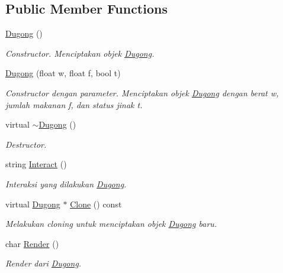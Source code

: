 \subsection*{Public Member Functions}
\begin{DoxyCompactItemize}
\item 
\hyperlink{classDugong_ab18a993807c0daa4b4a7eeaf7118ead7}{Dugong} ()
\begin{DoxyCompactList}\small\item\em Constructor. Menciptakan objek \hyperlink{classDugong}{Dugong}. \end{DoxyCompactList}\item 
\hyperlink{classDugong_af4aa8ab8370bbea5ccb75f5dd104f8e8}{Dugong} (float w, float f, bool t)
\begin{DoxyCompactList}\small\item\em Constructor dengan parameter. Menciptakan objek \hyperlink{classDugong}{Dugong} dengan berat w, jumlah makanan f, dan status jinak t. \end{DoxyCompactList}\item 
virtual \hyperlink{classDugong_a0fe188826a301ecf2b90f2eb60c9e5da}{$\sim$\+Dugong} ()
\begin{DoxyCompactList}\small\item\em Destructor. \end{DoxyCompactList}\item 
string \hyperlink{classDugong_a861c589c05a791faf03297eb6e718d9e}{Interact} ()
\begin{DoxyCompactList}\small\item\em Interaksi yang dilakukan \hyperlink{classDugong}{Dugong}. \end{DoxyCompactList}\item 
virtual \hyperlink{classDugong}{Dugong} $\ast$ \hyperlink{classDugong_a8209b4208bd32dfc0fa4e701679306c1}{Clone} () const 
\begin{DoxyCompactList}\small\item\em Melakukan cloning untuk menciptakan objek \hyperlink{classDugong}{Dugong} baru. \end{DoxyCompactList}\item 
char \hyperlink{classDugong_af82a8983c960604aa27dabe7fec53362}{Render} ()
\begin{DoxyCompactList}\small\item\em Render dari \hyperlink{classDugong}{Dugong}. \end{DoxyCompactList}\end{DoxyCompactItemize}

